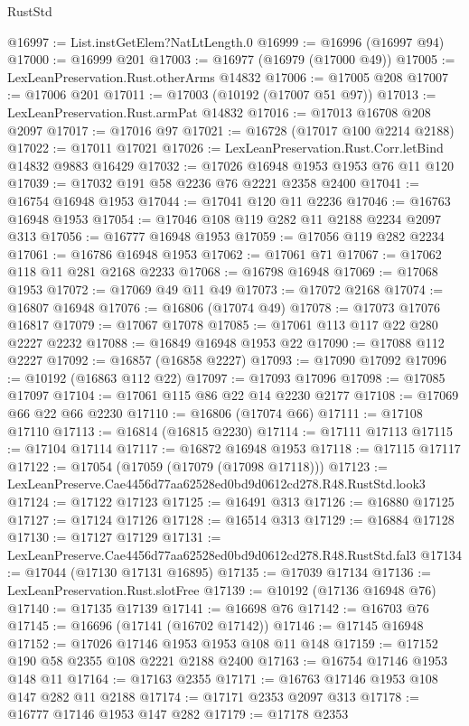 \begin{lexlean}{RustStd}
\begin{coremodule}
@16997 := List.instGetElem?NatLtLength.{0}
@16999 := @16996 (@16997 @94)
@17000 := @16999 @201
@17003 := @16977 (@16979 (@17000 @49))
@17005 := LexLeanPreservation.Rust.otherArms @14832
@17006 := @17005 @208
@17007 := @17006 @201
@17011 := @17003 (@10192 (@17007 @51 @97))
@17013 := LexLeanPreservation.Rust.armPat @14832
@17016 := @17013 @16708 @208 @2097
@17017 := @17016 @97
@17021 := @16728 (@17017 @100 @2214 @2188)
@17022 := @17011 @17021
@17026 := LexLeanPreservation.Rust.Corr.letBind @14832 @9883 @16429
@17032 := @17026 @16948 @1953 @1953 @76 @11 @120
@17039 := @17032 @191 @58 @2236 @76 @2221 @2358 @2400
@17041 := @16754 @16948 @1953
@17044 := @17041 @120 @11 @2236
@17046 := @16763 @16948 @1953
@17054 := @17046 @108 @119 @282 @11 @2188 @2234 @2097 @313
@17056 := @16777 @16948 @1953
@17059 := @17056 @119 @282 @2234
@17061 := @16786 @16948 @1953
@17062 := @17061 @71
@17067 := @17062 @118 @11 @281 @2168 @2233
@17068 := @16798 @16948
@17069 := @17068 @1953
@17072 := @17069 @49 @11 @49
@17073 := @17072 @2168
@17074 := @16807 @16948
@17076 := @16806 (@17074 @49)
@17078 := @17073 @17076 @16817
@17079 := @17067 @17078
@17085 := @17061 @113 @117 @22 @280 @2227 @2232
@17088 := @16849 @16948 @1953 @22
@17090 := @17088 @112 @2227
@17092 := @16857 (@16858 @2227)
@17093 := @17090 @17092
@17096 := @10192 (@16863 @112 @22)
@17097 := @17093 @17096
@17098 := @17085 @17097
@17104 := @17061 @115 @86 @22 @14 @2230 @2177
@17108 := @17069 @66 @22 @66 @2230
@17110 := @16806 (@17074 @66)
@17111 := @17108 @17110
@17113 := @16814 (@16815 @2230)
@17114 := @17111 @17113
@17115 := @17104 @17114
@17117 := @16872 @16948 @1953
@17118 := @17115 @17117
@17122 := @17054 (@17059 (@17079 (@17098 @17118)))
@17123 := LexLeanPreserve.Cae4456d77aa62528ed0bd9d0612cd278.R48.RustStd.look3
@17124 := @17122 @17123
@17125 := @16491 @313
@17126 := @16880 @17125
@17127 := @17124 @17126
@17128 := @16514 @313
@17129 := @16884 @17128
@17130 := @17127 @17129
@17131 := LexLeanPreserve.Cae4456d77aa62528ed0bd9d0612cd278.R48.RustStd.fal3
@17134 := @17044 (@17130 @17131 @16895)
@17135 := @17039 @17134
@17136 := LexLeanPreservation.Rust.slotFree
@17139 := @10192 (@17136 @16948 @76)
@17140 := @17135 @17139
@17141 := @16698 @76
@17142 := @16703 @76
@17145 := @16696 (@17141 (@16702 @17142))
@17146 := @17145 @16948
@17152 := @17026 @17146 @1953 @1953 @108 @11 @148
@17159 := @17152 @190 @58 @2355 @108 @2221 @2188 @2400
@17163 := @16754 @17146 @1953 @148 @11
@17164 := @17163 @2355
@17171 := @16763 @17146 @1953 @108 @147 @282 @11 @2188
@17174 := @17171 @2353 @2097 @313
@17178 := @16777 @17146 @1953 @147 @282
@17179 := @17178 @2353

\end{coremodule}
\end{lexlean}
